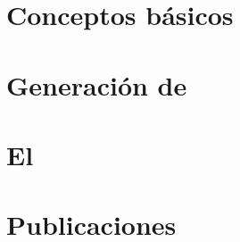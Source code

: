 




\section{Conceptos básicos}
\label{sec:arm:conceptos-basicos}





\section{\fim}
\label{sec:arm:fim}





\section{Generación de \ars}
\label{sec:arm:generacion-ar}





\section{El \IR}
\label{sec:arm:el-item-raro}





\section{Publicaciones}
\label{sec:arm:publicaciones}

